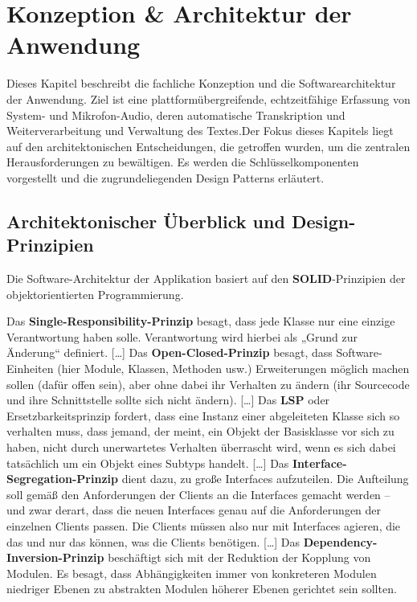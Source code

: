 
\chapter{Konzeption \& Architektur der Anwendung}
\label{chap:architektur}

Dieses Kapitel beschreibt die fachliche Konzeption und die Softwarearchitektur der Anwendung. Ziel ist eine plattformübergreifende, echtzeitfähige Erfassung von System- und Mikrofon-Audio, deren automatische Transkription und Weiterverarbeitung und Verwaltung des Textes.Der Fokus dieses Kapitels liegt auf den architektonischen Entscheidungen, die getroffen wurden, um die zentralen Herausforderungen zu bewältigen. Es werden die Schlüsselkomponenten vorgestellt und die zugrundeliegenden Design Patterns erläutert.


\section{Architektonischer Überblick und Design-Prinzipien}

Die Software-Architektur der Applikation basiert auf den \textbf{\ac{SOLID}}-Prinzipien der objektorientierten Programmierung.

\grqq Das \textbf{Single-Responsibility-Prinzip} besagt, dass jede Klasse nur eine einzige Verantwortung haben solle. Verantwortung wird hierbei als „Grund zur Änderung“ definiert. […] Das \textbf{Open-Closed-Prinzip} besagt, dass Software-Einheiten (hier Module, Klassen, Methoden usw.) Erweiterungen möglich machen sollen (dafür offen sein), aber ohne dabei ihr Verhalten zu ändern (ihr Sourcecode und ihre Schnittstelle sollte sich nicht ändern). […] Das \textbf{\ac{LSP}} oder Ersetzbarkeitsprinzip fordert, dass eine Instanz einer abgeleiteten Klasse sich so verhalten muss, dass jemand, der meint, ein Objekt der Basisklasse vor sich zu haben, nicht durch unerwartetes Verhalten überrascht wird, wenn es sich dabei tatsächlich um ein Objekt eines Subtyps handelt. […] Das \textbf{Interface-Segregation-Prinzip} dient dazu, zu große Interfaces aufzuteilen. Die Aufteilung soll gemäß den Anforderungen der Clients an die Interfaces gemacht werden – und zwar derart, dass die neuen Interfaces genau auf die Anforderungen der einzelnen Clients passen. Die Clients müssen also nur mit Interfaces agieren, die das und nur das können, was die Clients benötigen. […] Das \textbf{Dependency-Inversion-Prinzip} beschäftigt sich mit der Reduktion der Kopplung von Modulen. Es besagt, dass Abhängigkeiten immer von konkreteren Modulen niedriger Ebenen zu abstrakten Modulen höherer Ebenen gerichtet sein sollten.  \grqq\ \cite{wiki:solid}


